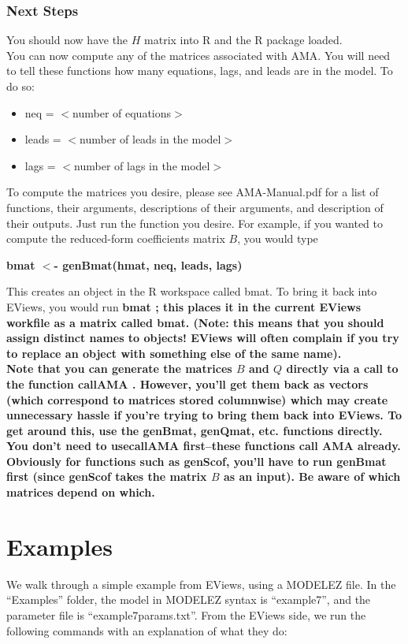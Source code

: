 \documentclass[12pt]{article}
\newcommand{\rcmd}[1]{
\vspace{0.2in}

{\bfseries #1}

\vspace{0.2in}
}
\begin{document}
\subsubsection{Next Steps}
You should now have the $H$ matrix into R and the R package loaded. \\

You can now compute any of the matrices associated with AMA.  You will need to tell these functions how many equations, lags, and leads are in the model.  To do so: \begin{itemize}
\item  neq = $<$number of equations$>$
\item  leads = $<$number of leads in the model$>$
\item  lags = $<$number of lags in the model$>$
\end{itemize}
To compute the matrices you desire, please see AMA-Manual.pdf for a list of functions, their arguments, descriptions of their arguments, and description of their outputs.  Just run  the function you desire.  For example, if you wanted to compute the reduced-form coefficients matrix $B$, you would type 

 \rcmd{bmat $<$- genBmat(hmat, neq, leads, lags)}
This creates an object in the R workspace called
 bmat.  To bring it back into EViews, you would run \bfseries  bmat \normalfont; this places it in the current EViews workfile as a matrix called {\bfseries bmat}. (Note: this means that you should assign distinct names to objects! EViews will often complain if you try to replace an object with something else of the same name). \\

Note that you can generate the matrices $B$ and $Q$ directly via a call to the function \bfseries callAMA \normalfont.  However, you'll get them back as vectors (which correspond to matrices stored columnwise) which may create unnecessary hassle if you're trying to bring them back into EViews.  To get around this, use the \bfseries genBmat, genQmat\normalfont, etc. functions directly.  You don't need to use\bfseries callAMA \normalfont first--these functions call AMA already.  \\
Obviously for functions such as {\bfseries genScof}, you'll have to run {\bfseries genBmat} first (since {\bfseries genScof} takes the matrix $B$ as an input).  Be aware of which matrices depend on which. \\


\section{Examples}
We walk through a simple example from EViews, using a MODELEZ file.  In the ``Examples'' folder, the model in MODELEZ syntax is ``example7'', and the parameter file is ``example7params.txt''.  From the EViews side, we run the following commands with an explanation of what they do: \\
\end{document}
